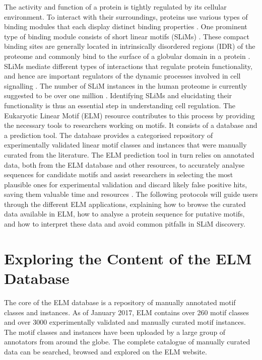 \documentclass[12pt]{article}
\newcounter{proto}
\begin{document}
The activity and function of a protein is tightly regulated by its
cellular environment. To interact with their surroundings, proteins use
various types of binding modules that each display distinct binding
properties \citep{10550212}. One prominent type of binding module
consists of short linear motifs (SLiMs) \citep{18508681}. These compact
binding sites are generally located in intrinsically disordered regions
(IDR) of the proteome and commonly bind to the
surface of a globular domain in a protein \citep{21909575}. SLiMs mediate
different types of interactions that regulate protein functionality, and hence
are important regulators of the dynamic processes involved in cell
signalling \citep{22480932} \citep{24926813}. The number of
SLiM instances in the human proteome is currently suggested to be over
one million \citep{25038412}. Identifying SLiMs and elucidating their
functionality is thus an essential step in understanding cell regulation.
The Eukaryotic Linear Motif (ELM) resource contributes to this process by
providing the necessary tools to researchers working on motifs. It
consists of a database and a prediction tool. The database provides a
categorised repository of experimentally validated linear motif classes
and instances that were manually curated from the literature. The ELM
prediction tool in turn relies on annotated data, both from the ELM
database and other resources, to accurately analyse sequences
for candidate motifs and assist researchers in selecting the most
plausible ones for experimental validation and discard likely false
positive hits, saving them valuable time and resources \citep{22110040}.
The following protocols will guide users through the different ELM
applications, explaining how to browse the curated data available in
ELM, how to analyse a protein sequence for putative motifs, and how to
interpret these data and avoid common pitfalls in SLiM discovery.


%
%
\section{Exploring the Content of the ELM Database}%
\label{sec:explore_content}%

The core of the ELM database is a repository of manually annotated motif classes
and instances. As of January 2017, ELM contains over 260 motif classes and over
3000 experimentally validated and manually curated motif instances. The motif
classes and instances have been uploaded by a large group of annotators from
around the globe. The complete catalogue of manually curated data can be
searched, browsed and explored on the ELM website.
\end{document}
